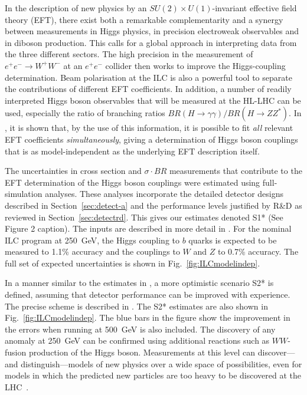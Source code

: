 \documentclass[%
reprint,
 floatfix,
 amsmath,amssymb,
 aps,
]{revtex4-1}
\begin{document}
In the description of new physics by an $SU(2)\times U(1)$-invariant effective field theory (EFT), there exist both a remarkable complementarity and a synergy between measurements in Higgs physics, in precision electroweak observables and in diboson production. This calls for a global approach in interpreting data from the three different sectors. The high precision in  the measurement of $e^+e^- \to W^+W^-$ at an $e^+e^-$ collider then works to improve the Higgs-coupling determination. Beam polarisation at the ILC is also a powerful tool
to separate the contributions of different EFT
coefficients.  In addition, a number of readily interpreted Higgs boson observables that will be measured at the HL-LHC can be used, especially the 
ratio of branching ratios  $BR(H\to \gamma\gamma)/BR(H\to ZZ^*)$. 
  In \cite{Barklow:2017suo}, it is shown that, by the use of this information, 
  it is possible to fit {\it all}
relevant EFT
coefficients  {\it simultaneously}, giving a 
determination of Higgs boson couplings that is as
model-independent as the underlying EFT description itself. 

 
The uncertainties in  cross section and $\sigma\cdot BR$ measurements that contribute to the EFT determination of the Higgs boson couplings were estimated using full-simulation analyses.  These analyses incorporate the detailed detector designs described in Section~\ref{sec:detect-a}
and the performance levels justified by R\&D as reviewed in Section~\ref{sec:detectrd}.
This gives our estimates denoted S1* (See Figure 2 caption).  The inputs are described in more detail in \cite{ILCforESS}. 
For the nominal ILC program at 250~GeV, the Higgs
coupling to $b$ quarks is expected to be measured to 1.1\% accuracy and the
couplings to $W$ and $Z$ to 0.7\% accuracy. 
The full set  of  expected
uncertainties  is shown in Fig.~\ref{fig:ILCmodelindep}. 

In a manner similar to the estimates in \cite{Yellow}, a more optimistic scenario S2* is defined, assuming that detector performance can be improved with experience.   The precise scheme is described in \cite{ILCforESS}.   The S2* estimates are also shown in Fig.~\ref{fig:ILCmodelindep}.   The blue bars in the figure show the improvement in the errors when running at 500~GeV is also included.    The 
discovery of any anomaly at 250~GeV can be confirmed 
using additional reactions  such as $WW$-fusion production of the
Higgs boson.   Measurements at this
level can discover---and distinguish---models of new physics over a
wide space of possibilities, even for models in which the predicted new
particles are too heavy to be discovered at the
LHC~\cite{Barklow:2017suo}.
\end{document}

